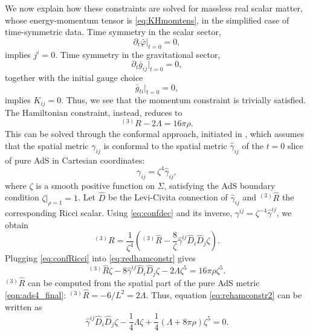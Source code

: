 \documentclass[aps,letterpaper,twocolumn,nofootinbib]{revtex4}
\numberwithin{equation}{section}
\begin{document}
We now explain how these constraints are solved for massless real scalar matter, whose energy-momentum tensor is \eqref{eq:KHmomtens}, in the simplified case of time-symmetric data. Time symmetry in the scalar sector,
\begin{equation}
\partial_t \bar{\varphi}\big|_{t=0}=0,
\end{equation}
implies $j^i=0$. Time symmetry in the gravitational sector,
\begin{equation}
\partial_t \bar{g}_{ij}\big|_{t=0}=0,
\end{equation}
together with the initial gauge choice
\begin{equation}
\bar{g}_{ti}\big|_{t=0}=0,
\end{equation}
implies $K_{ij}=0$. Thus, we see that the momentum constraint is trivially satisfied.
The Hamiltonian constraint, instead, reduces to
\begin{equation}
\label{eq:redhamconstr}
^{(3)}R-2\Lambda=16\pi\rho.
\end{equation}
This can be solved through the conformal approach, initiated in \cite{Lichnerowicz:1994}, which assumes that the spatial metric $\gamma_{ij}$ is conformal to the spatial metric $\hat{\gamma}_{ij}$ of the $t=0$ slice of pure AdS in Cartesian coordinates:
\begin{equation}
\label{eq:confdec}
\gamma_{ij}=\zeta^4 \hat{\gamma}_{ij},
\end{equation}
where $\zeta$ is a smooth positive function on $\Sigma$, satisfying the AdS boundary condition $\zeta|_{\rho=1}=1$. Let $\hat{D}$ be the Levi-Civita connection of $\hat{\gamma}_{ij}$ and $^{(3)}\hat{R}$ the corresponding Ricci scalar. Using \eqref{eq:confdec} and its inverse, $\gamma^{ij}=\zeta^{-4} \hat{\gamma}^{ij}$, we obtain
\begin{equation}
\label{eq:confRicci}
^{(3)}R=\frac{1}{\zeta^4}\left(^{(3)}\hat{R}-\frac{8}{\zeta}\hat{\gamma}^{ij}\hat{D}_i \hat{D}_j \zeta\right).
\end{equation}
Plugging \eqref{eq:confRicci} into \eqref{eq:redhamconstr} gives
\begin{equation}
\label{eq:rehamconstr2}
^{(3)}\hat{R}\zeta-8\hat{\gamma}^{ij}\hat{D}_i \hat{D}_j \zeta-2\Lambda \zeta^5=16\pi\rho \zeta^5.
\end{equation}
$^{(3)}\hat{R}$ can be computed from the spatial part of the pure AdS metric \eqref{eqn:ads4_final}: $^{(3)}\hat{R}=-6/L^2=2\Lambda$. Thus, equation \eqref{eq:rehamconstr2} can be written as
\begin{equation}
\label{eq:rehamconstr3}
\hat{\gamma}^{ij}\hat{D}_i \hat{D}_j \zeta-\frac{1}{4}\Lambda\zeta+\frac{1}{4}(\Lambda+8\pi\rho)\zeta^5=0.
\end{equation}
\end{document}
